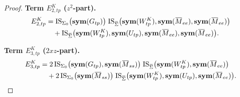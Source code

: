 \begin{proof}
\medskip
\noindent\textbf{Term $E^{K}_{2,tp}$ ($z^2$-part).}
\begin{align}\label{eq:E2tp_final}
E^{K}_{2,tp}
&=\mathrm{IS}_{\Sigma_0}\big(\symfun(G_{tp})\big)\;
  \mathrm{IS}_{\overline\Sigma}\big(\symfun(W^K_{tp}),\symfun(\overline M_{ee}),\symfun(\overline M_{ee})\big) \nonumber \\
&\quad+
  \mathrm{IS}_{\overline\Sigma}\big(\symfun(W^K_{tp}),\symfun(U_{tp}),\symfun(\overline M_{ee}),\symfun(\overline M_{ee})\big).
\end{align}

\medskip
\noindent\textbf{Term $E^{K}_{3,tp}$ ($2xz$-part).}
\begin{align}\label{eq:E3tp_final}
E^{K}_{3,tp}
&=2\,\mathrm{IS}_{\Sigma_0}\big(\symfun(G_{tp}),\symfun(\overline M_{ss})\big)\;
     \mathrm{IS}_{\overline\Sigma}\big(\symfun(W^K_{tp}),\symfun(\overline M_{ee})\big) \nonumber \\
&\quad+
  2\,\mathrm{IS}_{\Sigma_0}\big(\symfun(\overline M_{ss})\big)\;
     \mathrm{IS}_{\overline\Sigma}\big(\symfun(W^K_{tp}),\symfun(U_{tp}),\symfun(\overline M_{ee})\big).
\end{align}


\end{proof}
